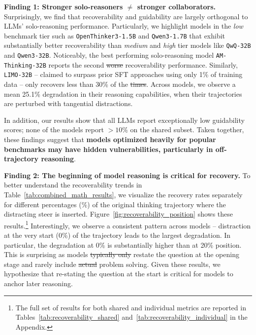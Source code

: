 \documentclass{article} %
\providecommand{\DIFaddtex}[1]{{\protect\color{blue}\uwave{#1}}} %
\providecommand{\DIFdeltex}[1]{{\protect\color{red}\sout{#1}}}                      %
\providecommand{\DIFaddbegin}{} %
\providecommand{\DIFaddend}{} %
\providecommand{\DIFdelbegin}{} %
\providecommand{\DIFdelend}{} %
\providecommand{\DIFadd}[1]{\texorpdfstring{\DIFaddtex{#1}}{#1}} %
\providecommand{\DIFdel}[1]{\texorpdfstring{\DIFdeltex{#1}}{}} %
\newcommand{\DIFscaledelfig}{0.5}
\newlength{\DIFdelgraphicswidth} %
\newlength{\DIFdelgraphicsheight} %
\newcommand{\DIFaddincludegraphics}[2][]{{\color{blue}\fbox{\DIFOincludegraphics[#1]{#2}}}} %
\newcommand{\DIFdelincludegraphics}[2][]{%
\sbox{\DIFdelgraphicsbox}{\DIFOincludegraphics[#1]{#2}}%
\settoboxwidth{\DIFdelgraphicswidth}{\DIFdelgraphicsbox} %
\settoboxtotalheight{\DIFdelgraphicsheight}{\DIFdelgraphicsbox} %
\scalebox{\DIFscaledelfig}{%
\parbox[b]{\DIFdelgraphicswidth}{\usebox{\DIFdelgraphicsbox}\\[-\baselineskip] \rule{\DIFdelgraphicswidth}{0em}}\llap{\resizebox{\DIFdelgraphicswidth}{\DIFdelgraphicsheight}{%
\setlength{\unitlength}{\DIFdelgraphicswidth}%
\begin{picture}(1,1)%
\thicklines\linethickness{2pt} %
{\color[rgb]{1,0,0}\put(0,0){\framebox(1,1){}}}%
{\color[rgb]{1,0,0}\put(0,0){\line( 1,1){1}}}%
{\color[rgb]{1,0,0}\put(0,1){\line(1,-1){1}}}%
\end{picture}%
}\hspace*{3pt}}} %
} %
\DeclareRobustCommand{\DIFaddbegin}{\DIFOaddbegin \let\includegraphics\DIFaddincludegraphics} %
\DeclareRobustCommand{\DIFaddend}{\DIFOaddend \let\includegraphics\DIFOincludegraphics} %
\DeclareRobustCommand{\DIFdelbegin}{\DIFOdelbegin \let\includegraphics\DIFdelincludegraphics} %
\DeclareRobustCommand{\DIFdelend}{\DIFOaddend \let\includegraphics\DIFOincludegraphics} %
\begin{document}
\textbf{Finding 1: Stronger solo-reasoners $\ne$ stronger collaborators.} Surprisingly, we find that recoverability and guidability are largely orthogonal to LLMs' solo-reasoning performance. Particularly, we highlight models in the \textit{low} benchmark tier such as \texttt{OpenThinker3-1.5B}  and \texttt{Qwen3-1.7B} that exhibit substantially better recoverability than \textit{medium} and \textit{high} tier models like \texttt{QwQ-32B} and \texttt{Qwen3-32B}. Noticeably, the best performing solo-reasoning model \texttt{AM-Thinking-32B} reports the second \DIFdelbegin \DIFdel{worse }\DIFdelend \DIFaddbegin \DIFadd{worst }\DIFaddend recoverability performance. Similarly, \texttt{LIMO-32B} -- claimed to surpass prior SFT approaches using only 1\% of training data -- only recovers less than 30\% of the \DIFdelbegin \DIFdel{times}\DIFdelend \DIFaddbegin \DIFadd{time}\DIFaddend . Across models, we observe a mean 25.1\% degradation in their reasoning capabilities, when their trajectories are perturbed with tangential distractions. 

In addition, our results show that all LLMs report exceptionally low guidability scores; none of the models report $\!>\!10\%$ on the shared subset. Taken together, these findings suggest that \textbf{models optimized heavily for popular benchmarks may have hidden vulnerabilities, particularly in off-trajectory reasoning}.


\textbf{Finding 2: The beginning of model reasoning is critical for recovery.} To better understand the recoverability trends in Table~\ref{tab:combined_math_results}, 
we visualize the recovery rates separately for different percentages ($\%$) of the original thinking trajectory where the distracting steer is inserted. Figure~\ref{fig:recoverability_position} shows these results.\footnote{The full set of results for both shared and individual metrics are reported in Tables~\ref{tab:recoverability_shared} and~\ref{tab:recoverability_individual} in the Appendix.} Interestingly, we observe a consistent pattern across models -- distraction at the very start (0\%) of the trajectory leads to the largest degradation. In particular, the degradation at 0\% is substantially higher than at 20\% position. This is surprising as models \DIFdelbegin \DIFdel{typically only }\DIFdelend \DIFaddbegin \DIFadd{tend to }\DIFaddend restate the question at the opening stage and rarely include \DIFdelbegin \DIFdel{actual }\DIFdelend \DIFaddbegin \DIFadd{substantive }\DIFaddend problem solving. Given these results, we hypothesize that re-stating the question at the start is critical for models to anchor later reasoning.
\end{document}
